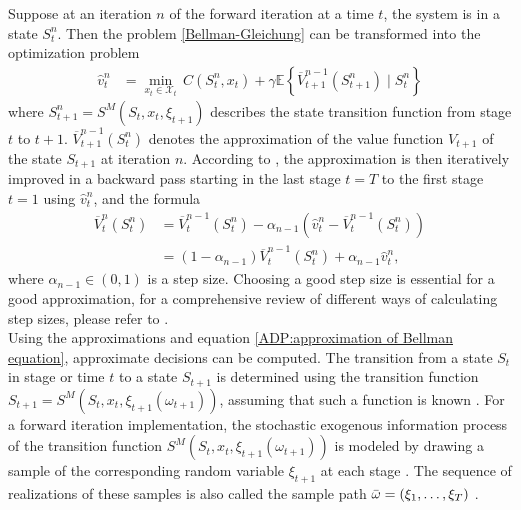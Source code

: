 Suppose at an iteration $n$ of the forward iteration at a time $t$, the system is in a state $S_t^n$.
Then the problem \ref{Bellman-Gleichung} can be transformed into the optimization problem
\begin{align}\label{ADP:approximation of Bellman equation}
    \hat{v}^n_t &= \underset{x_t \in \mathcal{X}_t}{\min} \, C(S_t^n, x_t) + \gamma \mathbb{E} \left\{\overline{V}_{t+1}^{n-1}(S_{t+1}^n) \mid S_t^n \right \}
\end{align}
where $S_{t+1}^n=S^M(S_t,x_t,\xi_{t+1})$ describes the state transition function from stage $t$ to $t+1$. 
$\overline{V}^{n-1}_{t+1}(S_t^n)$ denotes the approximation of the value function $V_{t+1}$ of the state $S_{t+1}$ at iteration $n$.
According to \cite{POWELL2019795, Powell_solving_Curses_of_Dimensionality}, the approximation is then iteratively improved in a backward pass starting in the last stage $t=T$ to the first stage $t=1$ using $\hat{v}^n_t$, and the formula 
\begin{subequations}\label{value_function_Update_TemporalDifference}
\begin{align}
    \overline{V}_t^n(S_t^n) &= \overline{V}_t^{n-1}(S_t^n) - \alpha_{n-1}(\hat{v}^n_t - \overline{V}_t^{n-1}(S_t^n)) \\
    & = (1-\alpha_{n-1})\overline{V}_t^{n-1}(S_t^n) + \alpha_{n-1}\hat{v}^n_t,
\end{align}
\end{subequations}
where $\alpha_{n-1}\in (0,1)$ is a step size.
Choosing a good step size is essential for a good approximation, for a comprehensive review of different ways of calculating step sizes, please refer to \cite{George_Powell_Stepsizes_Review}. \cite{Powell_solving_Curses_of_Dimensionality} \\
Using the approximations and equation \ref{ADP:approximation of Bellman equation}, approximate decisions can be computed.
The transition from a state $S_t$ in stage or time $t$ to a state $S_{t+1}$ is determined using the transition function $S_{t+1} = S^M(S_t,x_t,\xi_{t+1}(\omega_{t+1}))$, assuming that such a function is known \cite{Powell_solving_Curses_of_Dimensionality}.
For a forward iteration implementation, the stochastic exogenous information process of the transition function $S^M(S_t,x_t,\xi_{t+1}(\omega_{t+1}))$ is modeled by drawing a sample of the corresponding random variable $\xi_{t+1}$ at each stage \cite{Powell_solving_Curses_of_Dimensionality}.
The sequence of realizations of these samples is also called the sample path $\Bar{\omega} = (\xi_1,\dots,\xi_T)$ \cite{Powell_solving_Curses_of_Dimensionality}.
